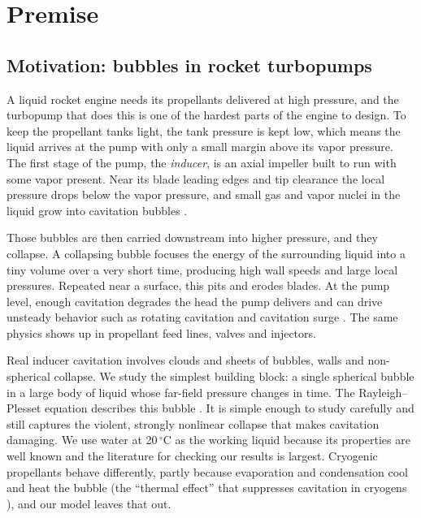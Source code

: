 \section{Premise}\label{sec:premise}

\subsection{Motivation: bubbles in rocket turbopumps}

A liquid rocket engine needs its propellants delivered at high pressure, and the turbopump
that does this is one of the hardest parts of the engine to design. To keep the propellant
tanks light, the tank pressure is kept low, which means the liquid arrives at the pump with
only a small margin above its vapor pressure. The first stage of the pump, the
\emph{inducer}, is an axial impeller built to run with some vapor present. Near its blade
leading edges and tip clearance the local pressure drops below the vapor pressure, and small
gas and vapor nuclei in the liquid grow into cavitation bubbles
\cite{brennen1994pumps,franc2004}.

Those bubbles are then carried downstream into higher pressure, and they collapse. A
collapsing bubble focuses the energy of the surrounding liquid into a tiny volume over a
very short time, producing high wall speeds and large local pressures. Repeated near a
surface, this pits and erodes blades. At the pump level, enough cavitation degrades the head
the pump delivers and can drive unsteady behavior such as rotating cavitation and cavitation
surge \cite{brennen1994pumps}. The same physics shows up in propellant feed lines, valves and
injectors.

Real inducer cavitation involves clouds and sheets of bubbles, walls and non-spherical
collapse. We study the simplest building block: a single spherical bubble in a large body of
liquid whose far-field pressure changes in time. The Rayleigh--Plesset equation describes
this bubble \cite{rayleigh1917,plesset1949,brennen1995}. It is simple enough to study
carefully and still captures the violent, strongly nonlinear collapse that makes cavitation
damaging. We use water at 20\,$^\circ$C as the working liquid because its properties are
well known and the literature for checking our results is largest. Cryogenic propellants
behave differently, partly because evaporation and condensation cool and heat the bubble
(the ``thermal effect'' that suppresses cavitation in cryogens \cite{brennen1995}), and our
model leaves that out.

